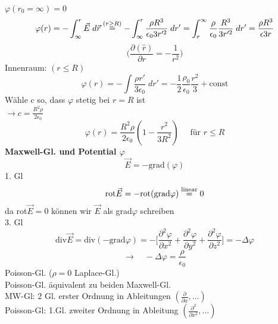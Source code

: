 \documentclass[titlepage,12pt,a4paper,ngerman]{report}
\newcommand{\tx}[1]{\textrm{#1}}
\begin{document}
$\varphi(r_0 = \infty) = 0$\\
$$\varphi(r) = -\int_\infty ^r \vec{E}\; d\vec{r} \buildrel (r\ge R) \over = -\int_\infty ^r \frac{\rho R^3}{\epsilon_0 3 r'^2}\; dr' =   \int_{r}^{\infty} \frac{\rho}{\epsilon_0} \frac{R^3}{3 r'^2}\; d r' = \frac{\rho R^3}{\epsilon 3 r}$$
$$\Big(\frac{\partial (\hat{r})}{\partial r} = - \frac{1}{r^2}\Big)$$
Innenraum: $(r\le R)$
$$\varphi (r) = -\int \frac{\rho r'}{3 \epsilon_0 } \; dr' = -\frac{1}{2} \frac{\rho_0}{\epsilon_0} \frac{r^2}{3} + \textrm{const}$$
Wähle c so, dass $\varphi$ stetig bei $r = R$ ist\\
$\rightarrow c = \frac{R^2 \rho}{2 \epsilon_0}$
$$\varphi(r) = \frac{R^2 \rho}{2 \epsilon_0} (1 - \frac{r^2}{3 R^2} ) \quad \textrm{ für } r\le R$$
\textbf{Maxwell-Gl. und Potential $\varphi$}
$$\vec{E} = -\textrm{grad}(\varphi)$$
1. Gl $$\textrm{rot}\vec{E} = - \textrm{rot}(\textrm{grad} \varphi )\buildrel \tx{linear} \over = 0$$
da rot$\vec{E} = 0$ können wir $\vec{E}$ als grad$\varphi$ schreiben\\
3. Gl $$\textrm{div}\vec{E} = \textrm{div}(-\textrm{grad} \varphi) = -\Big[\frac{\partial^2 \varphi}{\partial x^2} + \frac{\partial^2 \varphi}{\partial y^2} + \frac{\partial^2 \varphi}{\partial z^2} \Big] = - \Delta \varphi$$
$$\rightarrow \quad -\Delta \varphi = \frac{\rho}{\epsilon_0}$$ 
Poisson-Gl. ($\rho = 0$ Laplace-Gl.)\\
Poisson-Gl. äquivalent zu beiden Maxwell-Gl.\\
MW-Gl: 2 Gl. erster Ordnung in Ableitungen $(\frac{\partial}{\partial x} ,\dots )$\\
Poisson-Gl: 1.Gl. zweiter Ordnung in Ableitung $(\frac{\partial^2}{\partial x^2} , \dots )$\\
\end{document}
